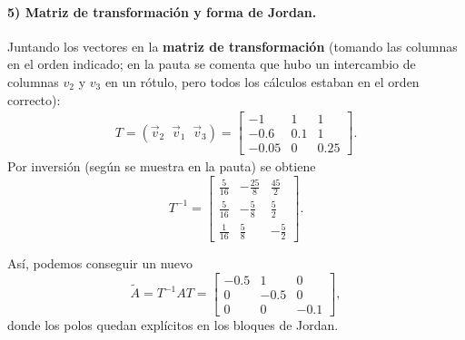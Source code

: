 \documentclass[
  11pt,
  letterpaper,
   addpoints,
  answers
  ]{exam}
\begin{document}
\begin{questions}
\begin{solution}
\paragraph{5) Matriz de transformación y forma de Jordan.}
Juntando los vectores en la \textbf{matriz de transformación} (tomando las columnas en el orden indicado; en la pauta se comenta que hubo un intercambio de columnas $v_2$ y $v_3$ en un rótulo, pero todos los cálculos estaban en el orden correcto):
\begin{align}
T=(\vec v_2\;\; \vec v_1\;\; \vec v_3)
=
\begin{bmatrix}
-1 & 1 & 1\\
-0.6 & 0.1 & 1\\
-0.05 & 0 & 0.25
\end{bmatrix}.
\end{align}
Por inversión (según se muestra en la pauta) se obtiene
\begin{equation}
T^{-1}=
\begin{bmatrix}
\frac{5}{16} & -\frac{25}{8} & \frac{45}{2}\\[2pt]
\frac{5}{16} & -\frac{5}{8}  & \frac{5}{2}\\[2pt]
\frac{1}{16} & \frac{5}{8}   & -\frac{5}{2}
\end{bmatrix}.
\end{equation}

Así, podemos conseguir un nuevo
\begin{equation}
\tilde A = T^{-1}AT =
\begin{bmatrix}
-0.5 & 1 & 0\\
0 & -0.5 & 0\\
0 & 0 & -0.1
\end{bmatrix},
\end{equation}
donde los polos quedan explícitos en los bloques de Jordan.


\end{solution}
\end{questions}
\end{document}
